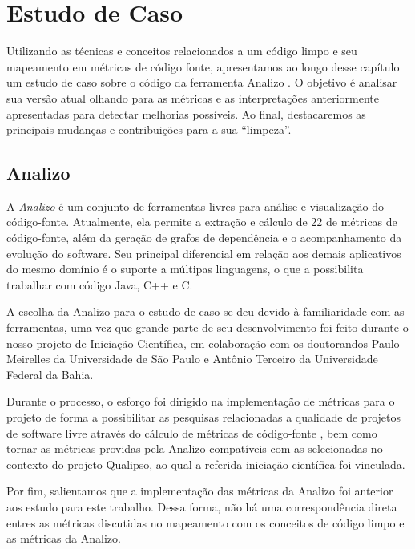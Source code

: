\chapter{Estudo de Caso}
\label{chap:estudodecaso}


Utilizando as técnicas e conceitos relacionados a um código limpo e seu mapeamento 
em métricas de código fonte, apresentamos ao longo desse capítulo um estudo de caso
sobre o código da ferramenta Analizo \citep{analizo2010}. O objetivo é analisar sua versão atual
olhando para as métricas e as interpretações anteriormente apresentadas para detectar
melhorias possíveis. Ao final, destacaremos as principais mudanças e contribuições para
a sua ``limpeza''.


\section{Analizo}

A \textit{Analizo} \citep{analizo2010} é um conjunto de ferramentas livres para análise e visualização
do código-fonte. Atualmente, ela permite a extração e cálculo de 22 de métricas
de código-fonte, além da geração de grafos de dependência e o acompanhamento da evolução do software.
Seu principal diferencial em relação aos demais aplicativos do mesmo domínio é o suporte a múltipas linguagens,
o que a possibilita trabalhar com código Java, C++ e C.

A escolha da Analizo para o estudo de caso se deu devido à familiaridade com as ferramentas, 
uma vez que grande parte de seu desenvolvimento foi feito durante o nosso projeto de Iniciação
Científica, em colaboração com os doutorandos Paulo Meirelles da Universidade de São Paulo
e Antônio Terceiro da Universidade Federal da Bahia.

Durante o processo, o esforço foi dirigido na implementação de métricas para o projeto
de forma a possibilitar as pesquisas relacionadas a qualidade de 
projetos de software livre através do cálculo de métricas de código-fonte
\citep{meirelles:sbqs09, carlos_morais_2009, meirelles2010, terceiro_rios_chavez_2010}, bem como tornar as 
métricas providas pela Analizo compatíveis com as selecionadas
no contexto do projeto Qualipso, ao qual a referida iniciação científica foi vinculada.

Por fim, salientamos que a implementação das métricas da Analizo foi anterior aos estudo
para este trabalho. Dessa forma, não há uma correspondência direta entres as métricas
discutidas no mapeamento com os conceitos de código limpo e as métricas da Analizo.

